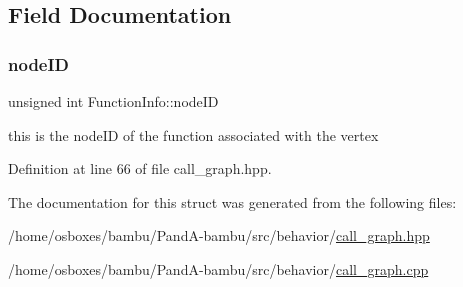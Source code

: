 \subsection{Field Documentation}
\mbox{\label{structFunctionInfo_a9aecdf5eb4f1a16921ed8459eda0f97f}} 
\subsubsection{\texorpdfstring{node\+ID}{nodeID}}
{\footnotesize\ttfamily unsigned int Function\+Info\+::node\+ID}



this is the node\+ID of the function associated with the vertex 



Definition at line 66 of file call\+\_\+graph.\+hpp.



The documentation for this struct was generated from the following files\+:\begin{DoxyCompactItemize}
\item 
/home/osboxes/bambu/\+Pand\+A-\/bambu/src/behavior/\hyperlink{call__graph_8hpp}{call\+\_\+graph.\+hpp}\item 
/home/osboxes/bambu/\+Pand\+A-\/bambu/src/behavior/\hyperlink{call__graph_8cpp}{call\+\_\+graph.\+cpp}\end{DoxyCompactItemize}
